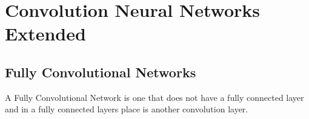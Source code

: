 \section{Convolution Neural Networks Extended}

\subsection*{Fully Convolutional Networks}
A Fully Convolutional Network is one that does not have a fully connected layer
and in a fully connected layers place is another convolution layer.